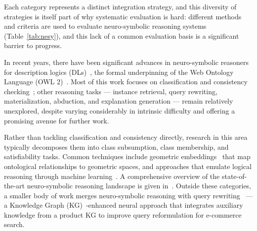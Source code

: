 Each category represents a distinct integration strategy, and this diversity of strategies is itself part of why systematic evaluation is hard: different methods and criteria are used to evaluate neuro-symbolic reasoning systems (Table~\ref{tab:nesy}), and this lack of a common evaluation basis is a significant barrier to progress.

In recent years, there have been significant advances in neuro-symbolic reasoners for description logics (DLs)~\cite{dlbook}, the formal underpinning of the Web Ontology Language (OWL 2)~\cite{owl2}. Most of this work focuses on classification and consistency checking~\cite{Sweb_foundation,sota2,sota1}; other reasoning tasks — instance retrieval, query rewriting, materialization, abduction, and explanation generation — remain relatively unexplored, despite varying considerably in intrinsic difficulty and offering a promising avenue for further work.

Rather than tackling classification and consistency directly, research in this area typically decomposes them into class subsumption, class membership, and satisfiability tasks. Common techniques include geometric embeddings~\cite{ELEm,Mondal,why_settle_for_one,faithful_embeddings} that map ontological relationships to geometric spaces, and approaches that emulate logical reasoning through machine learning~\cite{emulation,pointer_nw,noise-tolerant}. A comprehensive overview of the state-of-the-art neuro-symbolic reasoning landscape is given in~\cite{sota1,sota2}. Outside these categories, a smaller body of work merges neuro-symbolic reasoning with query rewriting~\cite{query_rewriting} — a Knowledge Graph (KG)~\cite{KG}-enhanced neural approach that integrates auxiliary knowledge from a product KG to improve query reformulation for e-commerce search.

